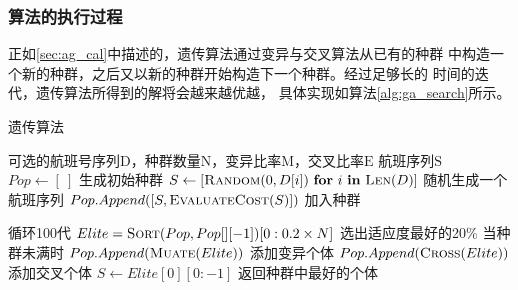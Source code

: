 \documentclass[fontset=fandol,a4paper,zihao=5]{ctexart}
\begin{document}
			\subsubsection{算法的执行过程}
			正如\ref{sec:ag_cal}中描述的，遗传算法通过变异与交叉算法从已有的种群
            中构造一个新的种群，之后又以新的种群开始构造下一个种群。经过足够长的
            时间的迭代，遗传算法所得到的解将会越来越优越，
            具体实现如算法\ref{alg:ga_search}所示。
			\begin{algorithm}
				\begin{algorithmic}
					\caption{\label{alg:ga_search}遗传算法}
					\Require $\text{可选的航班号序列D，种群数量N，变异比率M，交叉比率E}$
					\Ensure $\text{航班序列S}$
					\State $Pop \gets [\ ]$
					 \Comment 生成初始种群
						\State $S \gets [ \Call{Random}{0,D[i]}\ \textbf{for}\ i\ \textbf{in}\ \Call{Len}{D}]$ \Comment 随机生成一个航班序列
						\State $Pop.Append([S,\Call{EvaluateCost}{S}])$ \Comment 加入种群
					\EndFor
					
					 \Comment 循环100代
						\State $Elite = \Call{Sort}{Pop,Pop[][-1]}[0:0.2 \times N]$ \Comment 选出适应度最好的20\%
						 \Comment 当种群未满时
								\State $Pop.Append(\Call{Muate}{Elite})$ \Comment 添加变异个体
							\EndIf
							\State $Pop.Append(\Call{Cross}{Elite})$ \Comment 添加交叉个体
							\EndIf
						\EndWhile
					\EndFor
					\State $S \gets Elite[0][0:-1]$ \Comment 返回种群中最好的个体
					\State {}
					\EndFunction
				\end{algorithmic}
			\end{algorithm}
		
\end{document}
